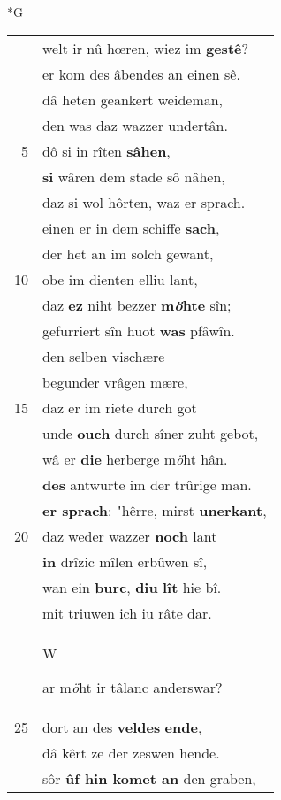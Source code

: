 \documentclass[8pt,a4paper,notitlepage]{article}
\begin{document}
\newpage
\begin{table}[ht]
\begin{minipage}[t]{0.5\linewidth}
\small
\begin{center}*G
\end{center}
\begin{tabular}{rl}
 & welt ir nû hœren, wiez im \textbf{gestê}?\\ 
 & er kom des âbendes an einen sê.\\ 
 & dâ heten geankert weideman,\\ 
 & den was daz wazzer undertân.\\ 
5 & dô si in rîten \textbf{sâhen},\\ 
 & \textbf{si} wâren dem stade sô nâhen,\\ 
 & daz si wol hôrten, waz er sprach.\\ 
 & einen er in dem schiffe \textbf{sach},\\ 
 & der het an im solch gewant,\\ 
10 & obe im dienten elliu lant,\\ 
 & daz \textbf{ez} niht bezzer \textbf{m\textit{ö}hte} sîn;\\ 
 & gefurriert sîn huot \textbf{was} pfâwîn.\\ 
 & den selben vischære\\ 
 & begunder vrâgen mære,\\ 
15 & daz er im riete durch got\\ 
 & unde \textbf{ouch} durch sîner zuht gebot,\\ 
 & wâ er \textbf{die} herberge m\textit{ö}ht hân.\\ 
 & \textbf{des} antwurte im der trûrige man.\\ 
 & \textbf{er sprach}: "hêrre, mirst \textbf{unerkant},\\ 
20 & daz weder wazzer \textbf{noch} lant\\ 
 & \textbf{in} drîzic mîlen erbûwen sî,\\ 
 & wan ein \textbf{burc}, \textbf{diu} \textbf{lît} hie bî.\\ 
 & mit triuwen ich iu râte dar.\\ 
 & \begin{large}W\end{large}ar m\textit{ö}ht ir tâlanc anderswar?\\ 
25 & dort an des \textbf{veldes} \textbf{ende},\\ 
 & dâ kêrt ze der zeswen hende.\\ 
 & sôr \textbf{ûf hin komet an} den graben,\\ 

\end{tabular}
\end{minipage}
\end{table}
\end{document}
